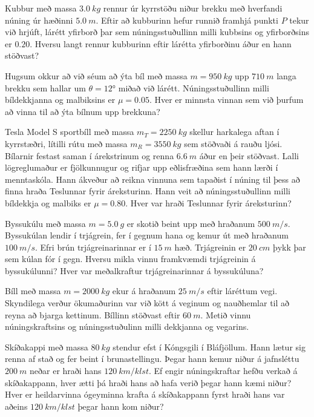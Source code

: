 \begin{enumerate}[label = \textbf{Dæmi \thechapter.\arabic*.}]
\begin{minipage}{\linewidth}
    \item Kubbur með massa $\SI{3.0}{kg}$ rennur úr kyrrstöðu niður brekku með hverfandi núning úr hæðinni $\SI{5.0}{m}$. Eftir að kubburinn hefur runnið framhjá punkti $P$ tekur við hrjúft, lárétt yfirborð þar sem núningsstuðullinn milli kubbsins og yfirborðsins er $0.20$. Hversu langt rennur kubburinn eftir lárétta yfirborðinu áður en hann stöðvast?

\end{minipage}

\item Hugsum okkur að við séum að ýta bíl með massa $m = \SI{950}{kg}$ upp $\SI{710}{m}$ langa brekku sem hallar um $\theta = \ang{12}$ miðað við lárétt. Núningsstuðullinn milli bíldekkjanna og malbiksins er $\mu = 0.05$. Hver er minnsta vinnan sem við þurfum að vinna til að ýta bílnum upp brekkuna?


\item Tesla Model S sportbíll með massa $m_T = \SI{2250}{kg}$ skellur harkalega aftan í kyrrstæðri, lítilli rútu með massa $m_R = \SI{3550}{kg}$ sem stöðvaði á rauðu ljósi. Bílarnir festast saman í árekstrinum og renna $\SI{6.6}{m}$ áður en þeir stöðvast. Lalli lögreglumaður er fjölkunnugur og rifjar upp eðlisfræðina sem hann lærði í menntaskóla. Hann ákveður að reikna vinnuna sem tapaðist í núning til þess að finna hraða Teslunnar fyrir áreksturinn. Hann veit að núningsstuðullinn milli bíldekkja og malbiks er $\mu = 0.80$. Hver var hraði Teslunnar fyrir áreksturinn?


\item Byssukúlu með massa $m = \SI{5.0}{g}$ er skotið beint upp með hraðanum $\SI{500}{m/s}$. Byssukúlan lendir í trjágrein, fer í gegnum hana og kemur út með hraðanum $\SI{100}{m/s}$. Efri brún trjágreinarinnar er í $\SI{15}{m}$ hæð. Trjágreinin er $\SI{20}{cm}$ þykk þar sem kúlan fór í gegn. Hversu mikla vinnu framkvæmdi trjágreinin á byssukúlunni? Hver var meðalkraftur trjágreinarinnar á byssukúluna?

\item Bíll með massa $m = \SI{2000}{kg}$ ekur á hraðanum $\SI{25}{m/s}$ eftir láréttum vegi. Skyndilega verður ökumaðurinn var við kött á veginum og nauðhemlar til að reyna að bjarga kettinum. Bíllinn stöðvast eftir $\SI{60}{m}$. Metið vinnu núningskraftsins og núningsstuðulinn milli dekkjanna og vegarins.
    

\item Skíðakappi með massa $\SI{80}{kg}$ stendur efst í Kóngsgili í Bláfjöllum. Hann lætur sig renna af stað og fer beint í brunastellingu. Þegar hann kemur niður á jafnsléttu $\SI{200}{m}$ neðar er hraði hans $\SI{120}{km/klst}$. Ef engir núningskraftar hefðu verkað á skíðakappann, hver ætti þá hraði hans að hafa verið þegar hann kæmi niður? Hver er heildarvinna ógeyminna krafta á skíðakappann fyrst hraði hans var aðeins $\SI{120}{km/klst}$ þegar hann kom niður?


\end{enumerate}
